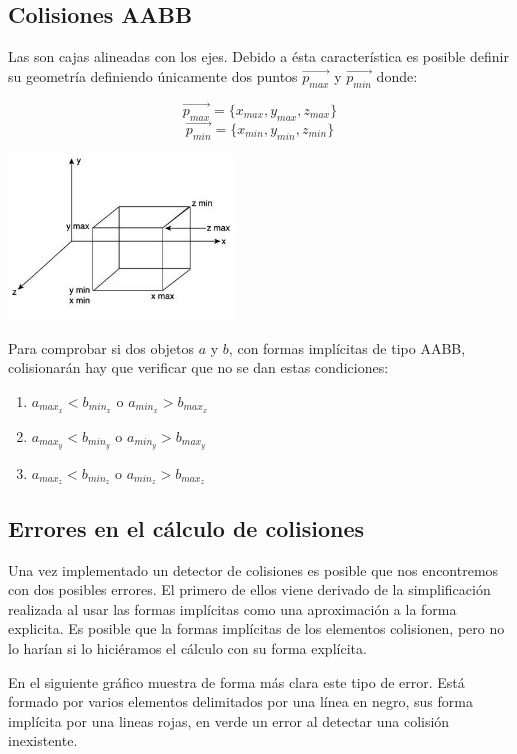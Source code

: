 \subsection{Colisiones AABB}

Las  son cajas alineadas con los ejes. Debido a ésta característica es posible definir su geometría definiendo únicamente dos puntos $\vec{p_{max}}$ y $\vec{p_{min}}$ donde: 

\parbox{7cm} {
$$ \vec{p_{max}} = \{x_{max}, y_{max}, z_{max}\} $$
$$ \vec{p_{min}} = \{x_{min}, y_{min}, z_{min}\} $$
}
\parbox{6cm}{\includegraphics[width=6cm]{img/aabb.jpg}}
\newline

Para comprobar si dos objetos $a$ y $b$, con formas implícitas de tipo AABB, colisionarán hay que verificar que no se dan estas condiciones: 
\begin{enumerate}
\item $a_{max_x} < b_{min_x}$ o $a_{min_x}> b_{max_x}$ 
\item $a_{max_y} < b_{min_y}$ o $a_{min_y}> b_{max_y}$ 
\item $a_{max_z} < b_{min_z}$ o $a_{min_z}> b_{max_z}$ 
\end{enumerate}

\subsection{Errores en el cálculo de colisiones}

Una vez implementado un detector de colisiones es posible que nos encontremos con dos posibles errores. El primero de ellos viene derivado de la simplificación realizada al usar las formas implícitas como una aproximación a la forma explicita. Es posible que la formas implícitas de los elementos colisionen, pero no lo harían si lo hiciéramos el cálculo con su forma explícita. 
\newline

En el siguiente gráfico muestra de forma más clara este tipo de error. Está formado por varios elementos delimitados por una línea en negro, sus forma implícita por una lineas rojas, en verde un error al detectar una colisión inexistente.
\newline


